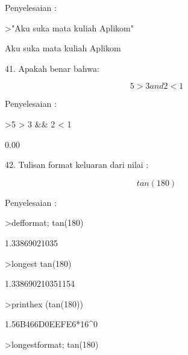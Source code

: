 \documentclass[a4paper,10pt]{article}
\begin{document}
\begin{eulernotebook}
\begin{eulercomment}
\begin{eulercomment}
\begin{eulercomment}
\begin{eulercomment}
\begin{eulercomment}
\begin{eulercomment}
\begin{eulercomment}
\begin{eulercomment}
\begin{eulercomment}
Penyelesaian :
\end{eulercomment}
\begin{eulerprompt}
>"Aku suka mata kuliah Aplikom"
\end{eulerprompt}
\begin{euleroutput}
  Aku suka mata kuliah Aplikom
\end{euleroutput}
\begin{eulercomment}
41. Apakah benar bahwa:\\
\end{eulercomment}
\begin{eulerformula}
\[
5 > 3 and 2 < 1
\]
\end{eulerformula}
\begin{eulercomment}
Penyelesaian :
\end{eulercomment}
\begin{eulerprompt}
>5 > 3 && 2 < 1
\end{eulerprompt}
\begin{euleroutput}
         0.00 
\end{euleroutput}
\begin{eulercomment}
42. Tulisan format keluaran dari nilai :\\
\end{eulercomment}
\begin{eulerformula}
\[
tan (180)
\]
\end{eulerformula}
\begin{eulercomment}
Penyelesaian :
\end{eulercomment}
\begin{eulerprompt}
>defformat; tan(180)
\end{eulerprompt}
\begin{euleroutput}
  1.33869021035
\end{euleroutput}
\begin{eulerprompt}
>longest tan(180)
\end{eulerprompt}
\begin{euleroutput}
        1.338690210351154 
\end{euleroutput}
\begin{eulerprompt}
>printhex (tan(180))
\end{eulerprompt}
\begin{euleroutput}
  1.56B466D0EEFE6*16^0
\end{euleroutput}
\begin{eulerprompt}
>longestformat; tan(180)
\end{eulerprompt}

\end{eulercomment}
\end{eulercomment}
\end{eulercomment}
\end{eulercomment}
\end{eulercomment}
\end{eulercomment}
\end{eulercomment}
\end{eulercomment}
\end{eulernotebook}
\end{document}
